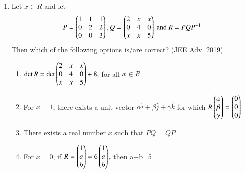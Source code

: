 \documentclass[journal,12pt,twocolumn]{IEEEtran}
\theoremstyle{remark}
\begin{document}
\begin{enumerate}
\item Let $x\in R$ and let
$$P = \begin{pmatrix}1&1&1\\0&2&2\\0&0&3\end{pmatrix},Q = \begin{pmatrix}2&x&x\\0&4&0\\x&x&5\end{pmatrix} \text{ and }R=PQP^{-1}$$
Then which of the following options is/are correct? \hfill (JEE Adv. 2019)


\begin{enumerate}
\item $\det R = \det\begin{pmatrix}2&x&x\\0&4&0\\x&x&5\end{pmatrix}+8,$ for all $x\in R$
\item For $x=1$, there exists a unit vector $\alpha\hat{i}+\beta\hat{j}+\gamma\hat{k}$ for which $R\begin{pmatrix}\alpha\\\beta\\\gamma\end{pmatrix}=\begin{pmatrix}0\\0\\0\end{pmatrix}$
		\item There exists a real number $x$ such that $PQ = QP$
		\item For $x=0$, if $R=\begin{pmatrix}1\\a\\b\end{pmatrix}=6\begin{pmatrix}1\\a\\b\end{pmatrix},$ then a+b=5\\[2pt]
\end{enumerate}
\end{enumerate}
\end{document}
